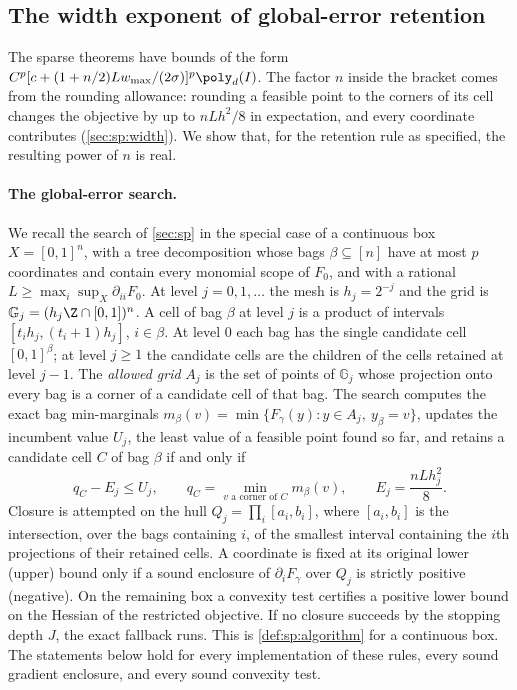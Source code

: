 \subsection{The width exponent of global-error retention}\label{sec:lim:width}

The sparse theorems have bounds of the form
$C^p[c+(1+n/2)Lw_{\max}/(2\sigma)]^p\poly_d(I)$. The factor $n$ inside the
bracket comes from the rounding allowance: rounding a feasible point to the
corners of its cell changes the objective by up to $nLh^2/8$ in expectation,
and every coordinate contributes (\cref{sec:sp:width}). We show that, for
the retention rule as specified, the resulting power of $n$ is real.

\paragraph{The global-error search.}
We recall the search of \cref{sec:sp} in the special case of a continuous
box $X=[0,1]^n$, with a tree decomposition whose bags $\beta\subseteq[n]$
have at most $p$ coordinates and contain every monomial scope of $F_0$, and
with a rational $L\ge\max_i\sup_X\partial_{ii}F_0$. At level $j=0,1,\ldots$
the mesh is $h_j=2^{-j}$ and the grid is
$\mathbb G_j=(h_j\Z\cap[0,1])^n$. A cell of bag $\beta$ at level $j$ is a
product of intervals $[t_ih_j,(t_i+1)h_j]$, $i\in\beta$. At level $0$ each
bag has the single candidate cell $[0,1]^\beta$; at level $j\ge1$ the
candidate cells are the children of the cells retained at level $j-1$. The
\emph{allowed grid} $A_j$ is the set of points of $\mathbb G_j$ whose
projection onto every bag is a corner of a candidate cell of that bag. The
search computes the exact bag min-marginals
$m_\beta(v)=\min\{F_\gamma(y):y\in A_j,\ y_\beta=v\}$, updates the
incumbent value $U_j$, the least value of a feasible point found so far,
and retains a candidate cell $C$ of bag $\beta$ if and only if
\begin{equation}\label{eq:lim:retain}
 q_C-E_j\le U_j,\qquad
 q_C=\min_{v\text{ a corner of }C}m_\beta(v),\qquad
 E_j=\frac{nLh_j^2}8 .
\end{equation}
Closure is attempted on the hull $Q_j=\prod_i[a_i,b_i]$, where $[a_i,b_i]$
is the intersection, over the bags containing $i$, of the smallest interval
containing the $i$th projections of their retained cells. A coordinate is
fixed at its original lower (upper) bound only if a sound enclosure of
$\partial_iF_\gamma$ over $Q_j$ is strictly positive (negative). On the
remaining box a convexity test certifies a positive lower bound on the
Hessian of the restricted objective. If no closure succeeds by the stopping
depth $J$, the exact fallback runs. This is \cref{def:sp:algorithm} for a
continuous box. The statements below hold for every implementation of these
rules, every sound gradient enclosure, and every sound convexity test.


